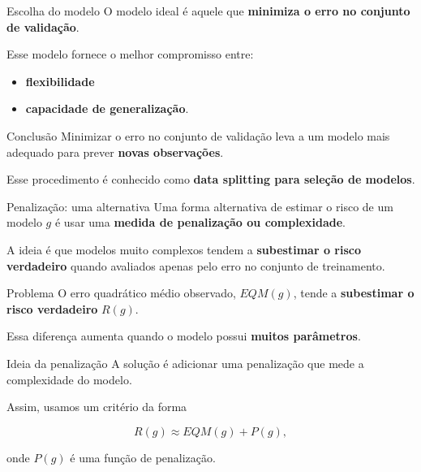 \documentclass[
  ignorenonframetext,
  aspectratio=169,
]{beamer}
\providecommand{\tightlist}{%
  \setlength{\itemsep}{0pt}\setlength{\parskip}{0pt}}
\begin{document}
\begin{frame}
\begin{block}{Escolha do modelo}
\label{escolha-do-modelo}
O modelo ideal é aquele que \textbf{minimiza o erro no conjunto de
validação}.

Esse modelo fornece o melhor compromisso entre:

\begin{itemize}
\tightlist
\item
  \textbf{flexibilidade}
\item
  \textbf{capacidade de generalização}.
\end{itemize}
\end{block}

\begin{block}{Conclusão}
\label{conclusuxe3o}
Minimizar o erro no conjunto de validação leva a um modelo mais adequado
para prever \textbf{novas observações}.

Esse procedimento é conhecido como \textbf{data splitting para seleção
de modelos}.
\end{block}
\end{frame}

\begin{frame}{Penalização: uma alternativa}
\label{penalizauxe7uxe3o-uma-alternativa}
Uma forma alternativa de estimar o risco de um modelo \(g\) é usar uma
\textbf{medida de penalização ou complexidade}.

A ideia é que modelos muito complexos tendem a \textbf{subestimar o
risco verdadeiro} quando avaliados apenas pelo erro no conjunto de
treinamento.
\end{frame}

\begin{frame}
\begin{block}{Problema}
\label{problema-1}
O erro quadrático médio observado, \(EQM(g)\), tende a
\textbf{subestimar o risco verdadeiro} \(R(g).\)

Essa diferença aumenta quando o modelo possui \textbf{muitos
parâmetros}.
\end{block}

\begin{block}{Ideia da penalização}
\label{ideia-da-penalizauxe7uxe3o}
A solução é adicionar uma penalização que mede a complexidade do modelo.

Assim, usamos um critério da forma

\[
R(g) \approx EQM(g) + P(g),
\]

onde \(P(g)\) é uma função de penalização.
\end{block}
\end{frame}
\end{document}
